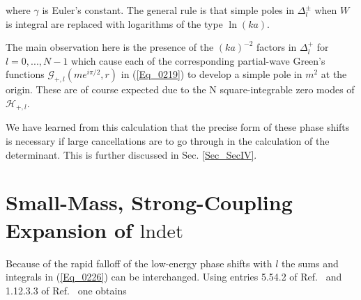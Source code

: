 \documentclass[a4paper,twocolumn,showpacs,preprintnumbers,amsmath,amssymb]{revtex4}
\newcommand{\half}{\frac{1}{2}}
\newcommand{\pdo}[1]{\ensuremath{\frac{\partial }
        {\partial #1 }}}
\begin{document}
\noindent
where $\gamma$ is Euler's constant. The general rule is that simple
poles in $\Delta^{\pm}_l$ when $W$ is integral are replaced with
logarithms of the type $\ln(ka)$.

The main observation here is the presence of the $(ka)^{-2}$ factors
in $\Delta^{+}_l$ for $l = 0, ..., N-1$ which cause each of the
corresponding partial-wave Green's functions
$\mathcal{G}_{+,l}(me^{i\pi/2},r)$ in (\ref{Eq_0219}) to develop a simple
pole in $m^2$ at the origin. These are of course expected due to the N
square-integrable zero modes of $\mathcal{H}_{+,l}$.

We have learned from this calculation that the precise form of these
phase shifts is necessary if large cancellations are to go through in
the calculation of the determinant. This is further discussed in
Sec. \ref{Sec_SecIV}.

\section{\label{Sec_SecIV}
Small-Mass, Strong-Coupling Expansion of $\text{lndet}$}

Because of the rapid falloff of the low-energy phase shifts
with $l$ the sums and integrals in (\ref{Eq_0226}) can be
interchanged. Using entries 5.54.2 of Ref.~\cite{Gradshteyn65} and
1.12.3.3 of Ref.~\cite{Prudnikov88} one obtains

\begin{comment}
\begin{widetext}
\begin{eqnarray}
\nonumber
\lefteqn{a^{-2} \,
 \int^{\infty}_a dr \, r \ln \left(\frac{r}{a}\right) K^2_W(mr)}\\[3mm]
\nonumber
  &=&
  \half K_{W+1}(ma) K'_W(ma) - \half K_W(ma) K'_{W+1}(ma)\\[5mm]
\label{Eq_0401}
  & & + \frac{W}{2ma}
  \left[
  K_{W+1}(ma) \pdo{W}K_W(ma) - K_W(ma) \pdo{W}K_{W+1}(ma)
  \right]\\[3mm]
\nonumber
  &=& \frac{\Gamma^2(W-1)}{16} \left(\frac{ma}{2}\right)^{-2W}
  + \frac{\pi}{16 \sin \pi W}
  \left[
  2W \psi(W) + \pi W \cot \pi W
  - 2W \ln \left(\frac{ma}{2}\right) - 2W + 1
  \right]
  \left(\frac{ma}{2}\right)^{-2}\\[5mm]
\label{Eq_0402}
  & &
  + \frac{\Gamma^2(W)}{8 (1-W) (2-W)^2} \left(\frac{ma}{2}\right)^{2-2W}
  + O[(ma)^{4-2W}, (ma)^0], l \neq N\\[3mm]
\nonumber
  &=& \frac{\Gamma^2(\epsilon - 1)}{16}
  \left(\frac{ma}{2}\right)^{-2\epsilon} + \frac{\pi}{16 \sin \pi\epsilon}
  \left[
  2\epsilon \psi(\epsilon) + \pi \epsilon \cot \pi \epsilon
  - 2 \epsilon \ln \left(\frac{ma}{2}\right) - 2 \epsilon + 1
  \right]
  \left(\frac{ma}{2}\right)^{-2}
  - \frac{\pi}{8 \epsilon \sin \pi \epsilon}\\[5mm]
\label{Eq_0403}
  & &
  + \frac{\pi^2}{16\Gamma^2(2 + \epsilon)(\sin \pi \epsilon)^2}
  \left(\frac{ma}{2}\right)^{2\epsilon}
  + \frac{\Gamma^2(\epsilon)}{8(1-\epsilon)(2-\epsilon)^2}
    \left(\frac{ma}{2}\right)^{2-2\epsilon}
  + O[(ma)^{2 + 2\epsilon}, (ma)^{4-2\epsilon}], l = N,
\end{eqnarray}
\end{widetext}
\end{comment}
\end{document}
